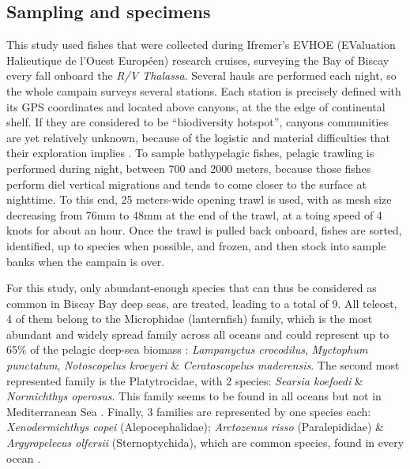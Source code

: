 

\subsection{Sampling and specimens}

This study used fishes that were collected during Ifremer's EVHOE (EValuation Halieutique de l'Ouest Européen) research cruises, surveying the Bay of Biscay every fall onboard the \textit{R/V Thalassa}.
Several hauls are performed each night, so the whole campain surveys several stations. Each station is precisely defined with its GPS coordinates and located above canyons, at the the edge of continental shelf. If they are considered to be ``biodiversity hotspot'', canyons communities are yet relatively unknown, because of the logistic and material difficulties that their exploration implies \citep{gillet2013}.
To sample bathypelagic fishes, pelagic trawling is performed during night, between 700 and 2000 meters, because those fishes perform diel vertical migrations and tends to come closer to the surface at nighttime. To this end, 25 meters-wide opening trawl is used, with as mesh size decreasing from 76mm to 48mm at the end of the trawl, at a toing speed of 4 knots for about an hour. 
Once the trawl is pulled back onboard, fishes are sorted, identified, up to species when possible, and frozen, and then stock into sample banks when the campain is over. 

For this study, only abundant-enough species that can thus be considered as common in Biscay Bay deep seas, are treated, leading to a total of 9. All teleost, 4 of them belong to the Microphidae (lanternfish) family, which is the most abundant and widely spread family across all oceans \citep{debusserolles2014} and could represent up to 65\% of the pelagic deep-sea biomass \citep{poulsen2013}: \textit{Lampanyctus crocodilus}, \textit{Myctophum punctatum}, \textit{Notoscopelus kroeyeri} \& \textit{Ceratoscopelus maderensis}. The second most represented family is the Platytrocidae, with 2 species: \textit{Searsia koefoedi} \& \textit{Normichthys operosus}. This family seems to be found in all oceans but not in Mediterranean Sea \citep{orrell2016}. Finally, 3 families are represented by one species each: \textit{Xenodermichthys copei} (Alepocephalidae); \textit{Arctozenus risso} (Paralepididae) \& \textit{Argyropelecus olfersii} (Sternoptychida), which are common species, found in every ocean \citep{carvalho1988,froese2019}.

